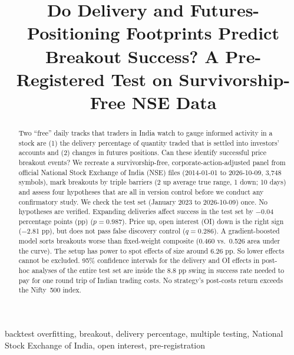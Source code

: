 \documentclass[conference]{IEEEtran}
\begin{document}
\title{Do Delivery and Futures-Positioning Footprints Predict Breakout Success? A Pre-Registered Test on Survivorship-Free NSE Data}

\author{
}

\maketitle

\begin{abstract}
Two ``free'' daily tracks that traders in India watch to gauge informed activity in a stock are (1) the
delivery percentage of quantity traded that is settled into investors' accounts and (2) changes in futures
positions. Can these identify successful price breakout events? We recreate a survivorship-free,
corporate-action-adjusted panel from official National Stock Exchange of India (NSE) files (2014-01-01 to
2026-10-09, 3,748 symbols), mark breakouts by triple barriers (2 up average true range, 1 down; 10 days) and
assess four hypotheses that are all in version control before we conduct any confirmatory study. We check the
test set (January 2023 to 2026-10-09) once. No hypotheses are verified. Expanding deliveries affect success in
the test set by \ensuremath{-}0.04 percentage points (pp) ($p=0.987$). Price up, open interest (OI) down is the
right sign (\ensuremath{-}2.81 pp), but does not pass false discovery control ($q=0.286$). A gradient-boosted
model sorts breakouts worse than fixed-weight composite (0.460 vs.\ 0.526 area under the curve). The setup has
power to spot effects of size around 6.26 pp. So lower effects cannot be excluded. 95\% confidence intervals for
the delivery and OI effects in post-hoc analyses of the entire test set are inside the 8.8 pp swing in success
rate needed to pay for one round trip of Indian trading costs. No strategy's post-costs return exceeds the
Nifty~500 index.
\end{abstract}

\begin{IEEEkeywords}
backtest overfitting, breakout, delivery percentage, multiple testing, National Stock Exchange of India, open
interest, pre-registration
\end{IEEEkeywords}
\end{document}
